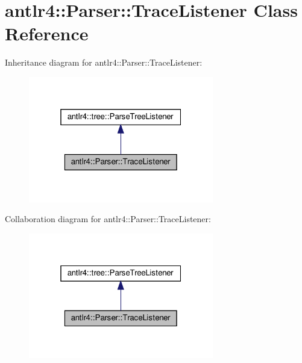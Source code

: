 \hypertarget{classantlr4_1_1Parser_1_1TraceListener}{}\section{antlr4\+:\+:Parser\+:\+:Trace\+Listener Class Reference}
\label{classantlr4_1_1Parser_1_1TraceListener}


Inheritance diagram for antlr4\+:\+:Parser\+:\+:Trace\+Listener\+:
\nopagebreak
\begin{figure}[H]
\begin{center}
\leavevmode
\includegraphics[width=229pt]{classantlr4_1_1Parser_1_1TraceListener__inherit__graph}
\end{center}
\end{figure}


Collaboration diagram for antlr4\+:\+:Parser\+:\+:Trace\+Listener\+:
\nopagebreak
\begin{figure}[H]
\begin{center}
\leavevmode
\includegraphics[width=229pt]{classantlr4_1_1Parser_1_1TraceListener__coll__graph}
\end{center}
\end{figure}
